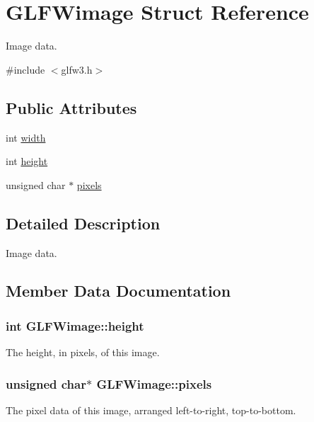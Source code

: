\hypertarget{structGLFWimage}{}\section{G\+L\+F\+Wimage Struct Reference}
\label{structGLFWimage}


Image data.  




{\ttfamily \#include $<$glfw3.\+h$>$}

\subsection*{Public Attributes}
\begin{DoxyCompactItemize}
\item 
int \hyperlink{structGLFWimage_af6a71cc999fe6d3aea31dd7e9687d835}{width}
\item 
int \hyperlink{structGLFWimage_a0b7d95368f0c80d5e5c9875057c7dbec}{height}
\item 
unsigned char $\ast$ \hyperlink{structGLFWimage_a0c532a5c2bb715555279b7817daba0fb}{pixels}
\end{DoxyCompactItemize}


\subsection{Detailed Description}
Image data. 

\subsection{Member Data Documentation}
\hypertarget{structGLFWimage_a0b7d95368f0c80d5e5c9875057c7dbec}{}
\subsubsection[{height}]{\setlength{\rightskip}{0pt plus 5cm}int G\+L\+F\+Wimage\+::height}\label{structGLFWimage_a0b7d95368f0c80d5e5c9875057c7dbec}
The height, in pixels, of this image. \hypertarget{structGLFWimage_a0c532a5c2bb715555279b7817daba0fb}{}
\subsubsection[{pixels}]{\setlength{\rightskip}{0pt plus 5cm}unsigned char$\ast$ G\+L\+F\+Wimage\+::pixels}\label{structGLFWimage_a0c532a5c2bb715555279b7817daba0fb}
The pixel data of this image, arranged left-\/to-\/right, top-\/to-\/bottom. \hypertarget{structGLFWimage_af6a71cc999fe6d3aea31dd7e9687d835}{}
